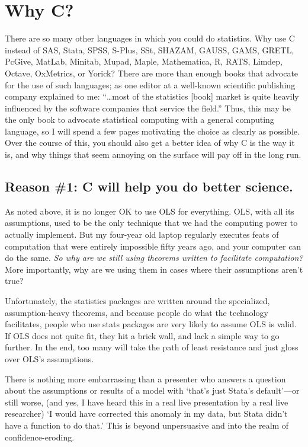 \section{Why C?}

There are so many other languages in which you could do
statistics. Why use C instead of SAS, Stata, SPSS, S-Plus, SSt, SHAZAM, GAUSS, GAMS, GRETL,
PcGive, MatLab, Minitab, Mupad, Maple, Mathematica, R, RATS, Limdep, Octave, OxMetrics, or Yorick? 
There are more than enough books that advocate for the use of such
languages; 
as one editor at a well-known scientific publishing company
explained to me: ``\dots most of the statistics [book] market is quite heavily
influenced by the software companies that service the
field.''  Thus, this may be the only book to advocate statistical computing
with a general computing language, so I will spend a few pages motivating
the choice as clearly as possible. Over the course of this, you should
also get a better idea of why C is the way it is, and why things that
seem annoying on the surface will pay off in the long run.
\ifbook
\subsection{Reason \#1: C will help you do better science.}
As noted above, it is no longer OK to use OLS for everything.
OLS, with all its assumptions, used to be the only technique that we had the computing
power to actually implement. But my four-year old laptop regularly executes
feats of computation that were entirely impossible fifty years ago, and your
computer can do the same.  {\it So why are
we still using theorems written to facilitate computation?} More importantly, why
are we using them in cases where their assumptions aren't true?

Unfortunately, the statistics packages are written around the
specialized, assumption-heavy theorems, and because people do what the
technology facilitates, people who use stats packages are very
likely to assume OLS is valid.  If OLS does not quite fit, they hit a
brick wall, and lack a simple way to go further. In the end, too many
will take the path of least resistance and just gloss over OLS's assumptions.

There is nothing more embarrassing than a presenter who answers a question
about the assumptions or results of a model with `that's just Stata's
default'---or still worse, (and yes, I have heard this in a real live
presentation by a real live researcher) `I would have corrected this
anomaly in my data, but Stata didn't have a function to do that.' This
is beyond unpersuasive and into the realm of confidence-eroding.

